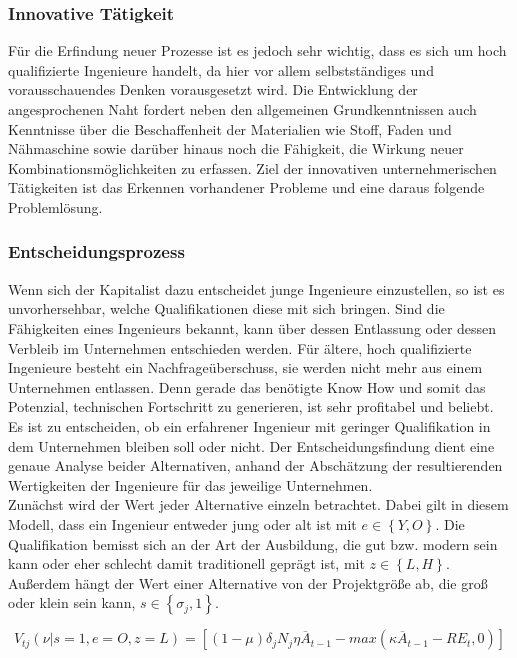 \subsubsection{Innovative Tätigkeit} 
Für die Erfindung neuer Prozesse ist es jedoch sehr wichtig, dass es sich um hoch qualifizierte Ingenieure handelt, da hier vor allem selbstständiges und vorausschauendes Denken vorausgesetzt wird. Die Entwicklung der angesprochenen Naht fordert neben den allgemeinen Grundkenntnissen auch Kenntnisse über die Beschaffenheit der Materialien wie Stoff, Faden und Nähmaschine sowie darüber hinaus noch die Fähigkeit, die Wirkung neuer Kombinationsmöglichkeiten zu erfassen. Ziel der innovativen unternehmerischen Tätigkeiten ist das Erkennen vorhandener Probleme und eine daraus folgende Problemlösung. 


\subsubsection{Entscheidungsprozess}
Wenn sich der Kapitalist dazu entscheidet junge Ingenieure einzustellen, so ist es unvorhersehbar, welche Qualifikationen diese mit sich bringen. Sind die Fähigkeiten eines Ingenieurs bekannt, kann über dessen Entlassung oder dessen Verbleib im Unternehmen entschieden werden. Für ältere, hoch qualifizierte Ingenieure besteht ein Nachfrageüberschuss, sie werden nicht mehr aus einem Unternehmen entlassen. Denn gerade das benötigte Know How und somit das Potenzial, technischen Fortschritt zu generieren, ist sehr profitabel und beliebt. Es ist zu entscheiden, ob ein erfahrener Ingenieur mit geringer Qualifikation in dem Unternehmen bleiben soll oder nicht. Der Entscheidungsfindung dient eine genaue Analyse beider Alternativen, anhand der Abschätzung der resultierenden Wertigkeiten der Ingenieure für das jeweilige  Unternehmen.\\
Zunächst wird der Wert jeder Alternative einzeln betrachtet. Dabei gilt in diesem Modell, dass ein Ingenieur entweder jung oder alt ist mit $e\in\left\{Y,O\right\}$. Die Qualifikation bemisst sich an der Art der Ausbildung, die gut bzw. modern sein kann oder eher schlecht damit traditionell geprägt ist, mit $z\in\left\{L,H\right\}$. Au{\ss}erdem hängt der Wert einer Alternative von der Projektgrö{\ss}e ab, die gro{\ss} oder klein sein kann, $s\in\left\{\sigma_j,1\right\}$.


	\begin{equation}
		V_{tj} (\nu|s=1,e=O,z=L)=[(1-\mu)\delta_j N_j \eta\overline{A}_{t-1}-max(\kappa\overline{A}_{t-1}-RE_t,0)]\label{Wert}
	\end{equation}


